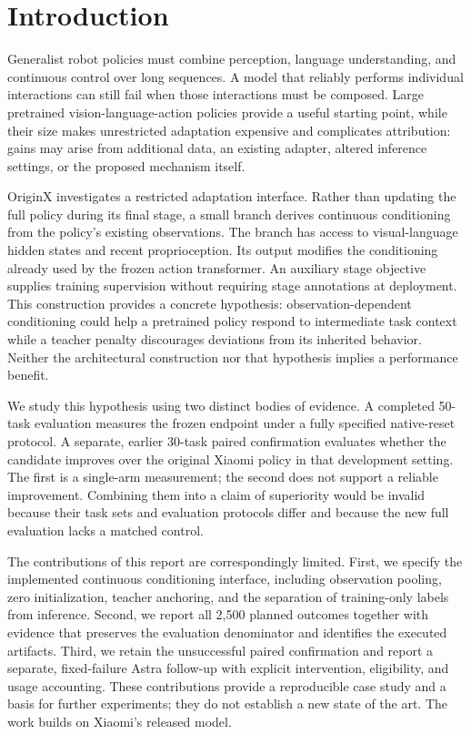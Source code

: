\documentclass[10pt,twocolumn,letterpaper]{article}
\begin{document}
\section{Introduction}

Generalist robot policies must combine perception, language understanding, and continuous control over long sequences. A model that reliably performs individual interactions can still fail when those interactions must be composed. Large pretrained vision-language-action policies provide a useful starting point, while their size makes unrestricted adaptation expensive and complicates attribution: gains may arise from additional data, an existing adapter, altered inference settings, or the proposed mechanism itself.


OriginX investigates a restricted adaptation interface. Rather than updating the full policy during its final stage, a small branch derives continuous conditioning from the policy's existing observations. The branch has access to visual-language hidden states and recent proprioception. Its output modifies the conditioning already used by the frozen action transformer. An auxiliary stage objective supplies training supervision without requiring stage annotations at deployment. This construction provides a concrete hypothesis: observation-dependent conditioning could help a pretrained policy respond to intermediate task context while a teacher penalty discourages deviations from its inherited behavior. Neither the architectural construction nor that hypothesis implies a performance benefit.


We study this hypothesis using two distinct bodies of evidence. A completed 50-task evaluation measures the frozen endpoint under a fully specified native-reset protocol. A separate, earlier 30-task paired confirmation evaluates whether the candidate improves over the original Xiaomi policy in that development setting. The first is a single-arm measurement; the second does not support a reliable improvement. Combining them into a claim of superiority would be invalid because their task sets and evaluation protocols differ and because the new full evaluation lacks a matched control.


The contributions of this report are correspondingly limited. First, we specify the implemented continuous conditioning interface, including observation pooling, zero initialization, teacher anchoring, and the separation of training-only labels from inference. Second, we report all 2,500 planned outcomes together with evidence that preserves the evaluation denominator and identifies the executed artifacts. Third, we retain the unsuccessful paired confirmation and report a separate, fixed-failure Astra follow-up with explicit intervention, eligibility, and usage accounting. These contributions provide a reproducible case study and a basis for further experiments; they do not establish a new state of the art. The work builds on Xiaomi's released model.
\end{document}
